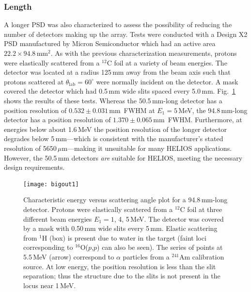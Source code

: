 \subsubsection{Length}
\label{sss:leng}
A longer PSD was also characterized to assess the possibility of reducing the number of detectors making up the array.  Tests were conducted with a Design X2 PSD manufactured by Micron Semiconductor which had an active area $22.2 \times 94.8$\,mm$^2$.
  As with the previous characterization measurements, protons were elastically scattered from a $^{12}$C foil at a variety of beam energies.  The detector was located at a radius 125\,mm  away from the beam axis such that protons scattered at $\theta_\mathrm{lab}=60^\circ$ were normally incident on the detector. A mask covered the detector which had 0.5\,mm wide slits spaced every 5.0\,mm.  Fig.~\ref{big_psd_test} shows the results of these tests.  Whereas the 50.5\,mm-long detector has a position resolution of $0.532 \pm 0.031$\,mm~FWHM at $E_1=5$\,MeV, the 94.8\,mm-long detector has a position resolution of $1.370 \pm 0.065$\,mm~FWHM.  Furthermore, at energies below about 1.6\,MeV the position resolution of the longer detector degrades below 5\,mm---which is consistent with the manufacturer's stated resolution of 5650\,$\mu$m---making it unsuitable for many HELIOS applications.  However, the 50.5\,mm detectors \textit{are} suitable for HELIOS, meeting the necessary design requirements.
\begin{figure}%
\centering
\texttt{[image: bigout1]}
\caption[Characteristic energy versus scattering angle plot for a 94.8\,mm-long detector]{Characteristic energy versus scattering angle plot for a 94.8\,mm-long detector.  Protons were elastically scattered from a $^{12}$C foil at three different beam energies $E_1=1$, 4, 5\,MeV.  The detector was covered by a mask with 0.50\,mm wide slits every 5\,mm.  Elastic scattering from $^1$H (box) is present due to water in the target (faint loci corresponding to $^{16}$O($p$,$p$) can also be seen).  The series of points at 5.5\,MeV (arrow) correspond to $\alpha$ particles from a $^{241}$Am calibration source.  At low energy, the position resolution is less than the slit separation; thus the structure due to the slits is not present in the locus near 1\,MeV.}
\label{big_psd_test}
\end{figure}
